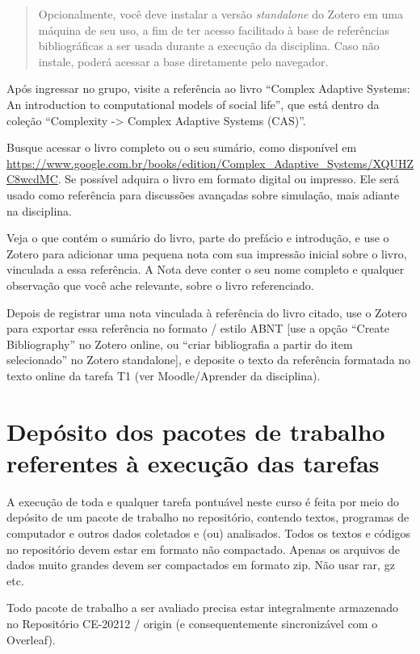 \begin{quote}
Opcionalmente, você deve instalar a versão \textit{standalone} do Zotero em uma máquina de seu uso, a fim de ter acesso facilitado à base de referências bibliográficas a ser usada durante a execução da disciplina. Caso não instale, poderá acessar a base diretamente pelo navegador.
\end{quote}

Após ingressar no grupo, visite a referência ao livro ``Complex Adaptive Systems: An introduction to computational models of social life'', que está dentro da coleção ``Complexity -> Complex Adaptive Systems (CAS)''.

Busque acessar o livro completo ou o seu sumário, como disponível em \url{https://www.google.com.br/books/edition/Complex_Adaptive_Systems/XQUHZC8wcdMC}. Se possível adquira o livro em formato digital ou impresso. Ele será usado como referência para discussões avançadas sobre simulação, mais adiante na disciplina.

Veja o que contém o sumário do livro, parte do prefácio e introdução, e use o Zotero para adicionar uma pequena nota com sua impressão inicial sobre o livro, vinculada a essa referência. A Nota deve conter o seu nome completo e qualquer observação que você ache relevante, sobre o livro referenciado.

Depois de registrar uma nota vinculada à referência do livro citado, use o Zotero para exportar essa referência no formato / estilo ABNT [use a opção ``Create Bibliography'' no Zotero online, ou ``criar bibliografia a partir do item selecionado''  no Zotero standalone], e deposite o texto da referência formatada no texto online da tarefa T1 (ver Moodle/Aprender da disciplina).

\section{Depósito dos pacotes de trabalho referentes à execução das tarefas}

A execução de toda e qualquer tarefa pontuável neste curso é feita por meio do depósito de um pacote de trabalho no repositório, contendo textos, programas de computador e outros dados coletados e (ou) analisados. Todos os textos e códigos no repositório devem estar em formato não compactado. Apenas os arquivos de dados muito grandes devem ser compactados em formato zip. Não usar rar, gz etc. 

Todo pacote de trabalho a ser avaliado precisa estar integralmente armazenado no Repositório CE-20212 / origin (e consequentemente sincronizável com o Overleaf).

